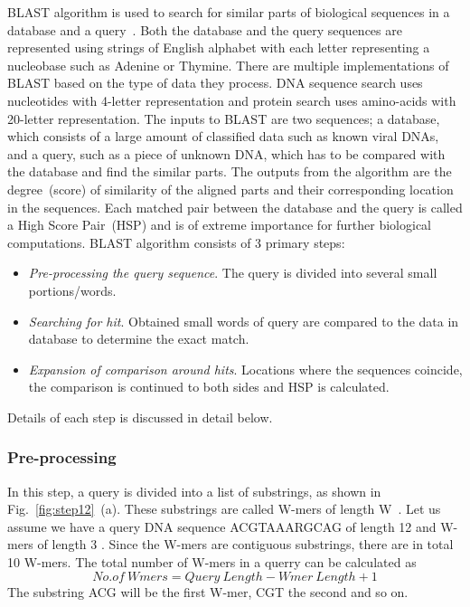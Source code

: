 BLAST algorithm is used to search for similar parts of biological sequences in a database and a query~\cite{Stephen1990}. 
Both the database and the query sequences are represented using strings of English alphabet with each letter representing a nucleobase such as Adenine or Thymine.
There are multiple implementations of BLAST based on the type of data they process. 
DNA sequence search uses nucleotides with 4-letter  representation and protein search uses amino-acids with 20-letter representation. 
The inputs to BLAST are two sequences; a database, which consists of a large amount of classified data such as known viral DNAs, and a query, such as a piece of unknown DNA, which has to be compared with the database and find the similar parts. 
The outputs from the algorithm are the degree~(score) of similarity of the aligned parts and their corresponding location in the sequences. 
Each matched pair between the database and the query is called a High Score Pair~(HSP) and is of extreme importance for further biological computations. 
BLAST algorithm consists of 3 primary steps:
\begin{itemize}
\item{\textit{Pre-processing the query sequence}. The query is divided into several small portions/words.} 
\item{\textit{Searching for hit}. Obtained small words of query are compared to the data in database to determine the exact match.}
\item{\textit{Expansion of comparison around hits}. Locations where the sequences coincide, the comparison is continued to both sides and HSP is calculated.}
\end{itemize}
Details of each step is discussed in detail below.

\subsubsection{\bf Pre-processing}
In this step, a query is divided into a list of substrings, as shown in Fig.~\ref{fig:step12}~(a). 
These substrings are called W-mers of length W~\cite{sotiriades2007design}. 
Let us assume we have a query DNA sequence ACGTAAARGCAG of length 12 and W-mers of length 3 \cite{sotiriades2007design}. 
Since the W-mers are contiguous substrings, there are in total 10 W-mers. 
The total number of W-mers in a querry can be calculated as 
\begin{equation}
\label{eq1}
No.of \ Wmers = Query \ Length - Wmer \ Length + 1 
\end{equation}
The substring ACG will be the first W-mer, CGT the second and so on. 



